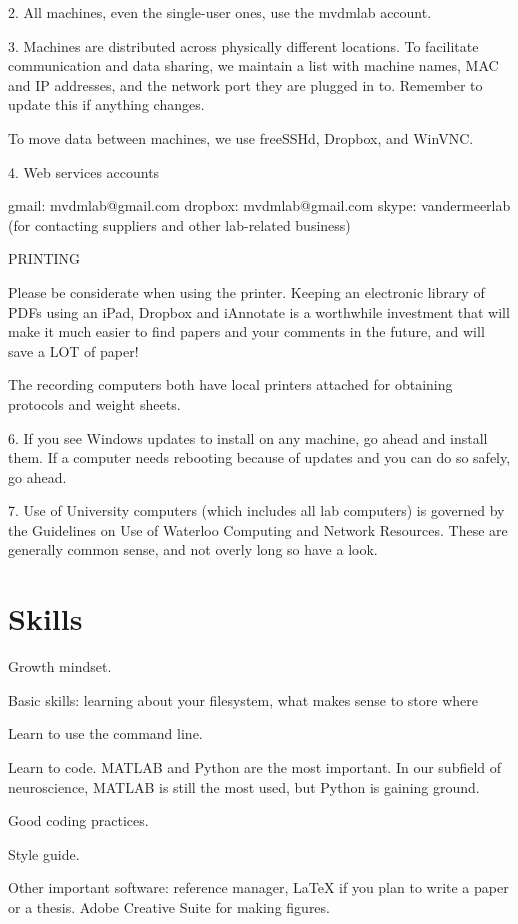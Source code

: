 \documentclass{tufte-book}
\begin{document}
2. All machines, even the single-user ones, use the mvdmlab
account.

3. Machines are distributed across physically different locations. To
facilitate communication and data sharing, we maintain a list with
machine names, MAC and IP addresses, and the network port they are
plugged in to. Remember to update this if anything changes.

To move data between machines, we use freeSSHd, Dropbox, and WinVNC.

4. Web services accounts

gmail: mvdmlab@gmail.com
dropbox: mvdmlab@gmail.com
skype: vandermeerlab (for contacting suppliers and other lab-related business)

PRINTING

Please be considerate when using the printer. Keeping an electronic
library of PDFs using an iPad, Dropbox and iAnnotate is a worthwhile
investment that will make it much easier to find papers and your
comments in the future, and will save a LOT of paper!

The recording computers both have local printers attached for
obtaining protocols and weight sheets.

6. If you see Windows updates to install on any machine, go ahead and
install them. If a computer needs rebooting because of updates and you
can do so safely, go ahead.

7. Use of University computers (which includes all lab computers) is
governed by the Guidelines on Use of Waterloo Computing and Network
Resources. These are generally common sense, and not overly long so
have a look.

\section{Skills}

Growth mindset.

Basic skills: learning about your filesystem, what makes sense to
store where

Learn to use the command line.

Learn to code. MATLAB and Python are the most important. In our
subfield of neuroscience, MATLAB is still the most used, but Python is
gaining ground.

Good coding practices.

Style guide.

Other important software: reference manager, LaTeX if you plan to
write a paper or a thesis. Adobe Creative Suite for making figures.
\end{document}
